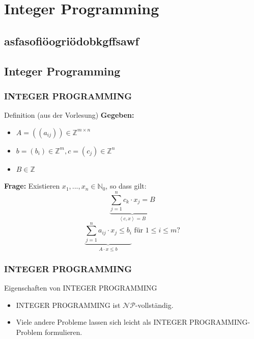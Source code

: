 \section{Integer Programming}
\subsection{asfasofiöogriödobkgffsawf}

\subsection{Integer Programming}
\begin{frame}
 \frametitle{INTEGER PROGRAMMING}
 \begin{block}{Definition (aus der Vorlesung)}
 \textbf{Gegeben: }
 \begin{itemize}
  \item $A = ((a_{ij})) \in \mathbb{Z}^{m \times n}$
  \item $b = (b_i) \in \mathbb{Z}^m, c = (c_j) \in \mathbb{Z}^n$
  \item $B\in \mathbb{Z}$
 \end{itemize}
\textbf{Frage: } Existieren $x_1, ..., x_n \in \mathbb{N}_0$, so dass gilt: $$\underbrace{\sum_{j=1}^n c_k \cdot x_j = B}_{\left\langle c, x\right\rangle = B}$$ $$\underbrace{\sum_{j=1}^n a_{ij} \cdot x_j \leq b_i}_{A \cdot x \leq b } \text{ für } 1 \leq i \leq m ?$$
 \end{block}
\end{frame}

\begin{frame}
 \frametitle{INTEGER PROGRAMMING}
 \begin{block}{Eigenschaften von INTEGER PROGRAMMING}
 \begin{itemize}
  \item INTEGER PROGRAMMING ist $\mathcal{NP}$-vollständig.
  \item Viele andere Probleme lassen sich leicht als INTEGER PROGRAMMING-Problem formulieren.
 \end{itemize}
 \end{block}
\end{frame}

